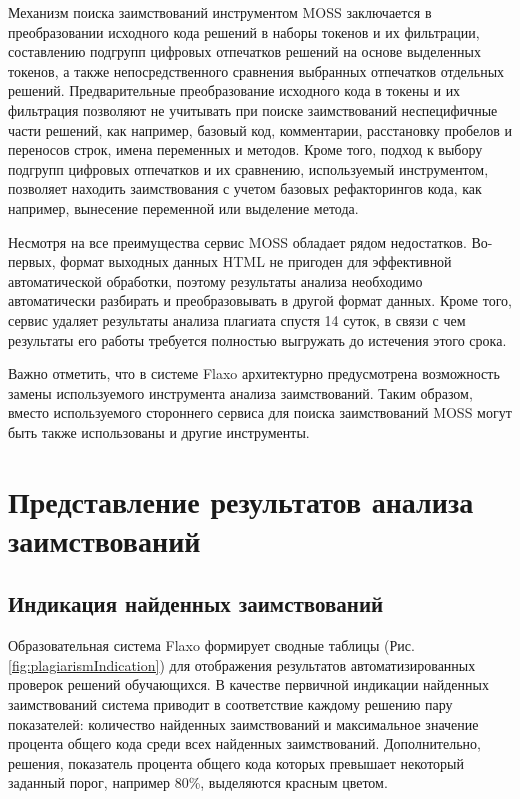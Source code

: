 \documentclass[a4paper,14pt]{extarticle}
\begin{document}
Механизм поиска заимствований инструментом MOSS заключается в преобразовании исходного кода решений в наборы токенов и их фильтрации, составлению подгрупп цифровых отпечатков решений на основе выделенных токенов, а также непосредственного сравнения выбранных отпечатков отдельных решений. Предварительные преобразование исходного кода в токены и их фильтрация позволяют не учитывать при поиске заимствований неспецифичные части решений, как например, базовый код, комментарии, расстановку пробелов и переносов строк, имена переменных и методов. Кроме того, подход к выбору подгрупп цифровых отпечатков и их сравнению, используемый инструментом, позволяет находить заимствования с учетом базовых рефакторингов кода, как например, вынесение переменной или выделение метода.

Несмотря на все преимущества сервис MOSS обладает рядом недостатков. Во-первых, формат выходных данных HTML не пригоден для эффективной автоматической обработки, поэтому результаты анализа необходимо автоматически разбирать и преобразовывать в другой формат данных. Кроме того, сервис удаляет результаты анализа плагиата спустя 14 суток, в связи с чем результаты его работы требуется полностью выгружать до истечения этого срока.

Важно отметить, что в системе Flaxo архитектурно предусмотрена возможность замены используемого инструмента анализа заимствований. Таким образом, вместо используемого стороннего сервиса для поиска заимствований MOSS могут быть также использованы и другие инструменты.

\section{Представление результатов анализа заимствований}

\subsection{Индикация найденных заимствований}

Образовательная система Flaxo формирует сводные таблицы (Рис. \ref{fig:plagiarismIndication}) для отображения результатов автоматизированных проверок решений обучающихся. В качестве первичной индикации найденных заимствований система приводит в соответствие каждому решению пару показателей: количество найденных заимствований и максимальное значение процента общего кода среди всех найденных заимствований. Дополнительно, решения, показатель процента общего кода которых превышает некоторый заданный порог, например 80\%, выделяются красным цветом.
\end{document}
